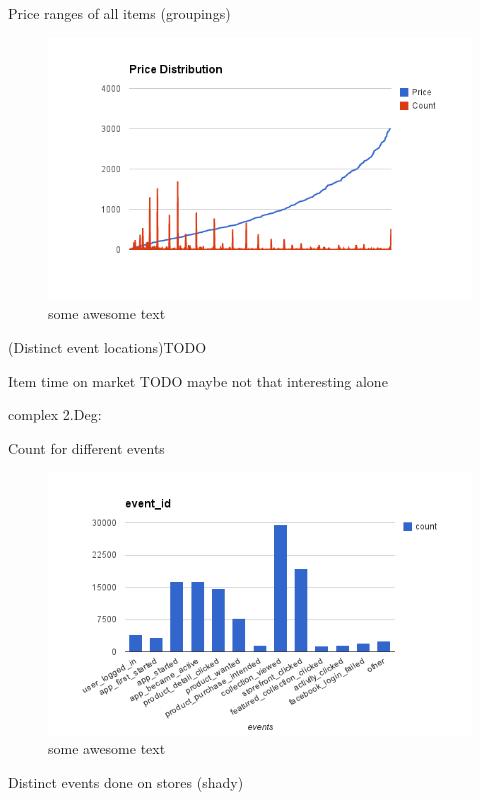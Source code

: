         Price ranges of all items (groupings)

\begin{figure}[H]
    \includegraphics[width=5in]{image/price_distr.png}
    \centering
    \caption[Price distribution of items]{some awesome text}
    \label{figure:ratingdistr}
\end{figure}

        (Distinct event locations)TODO

        Item time on market TODO maybe not that interesting alone


    complex 2.Deg:

        Count for different events

\begin{figure}[H]
    \includegraphics[width=5in]{image/event_id.png}
    \centering
    \caption[Count for different events]{some awesome text}
\end{figure}

        Distinct events done on stores (shady)

